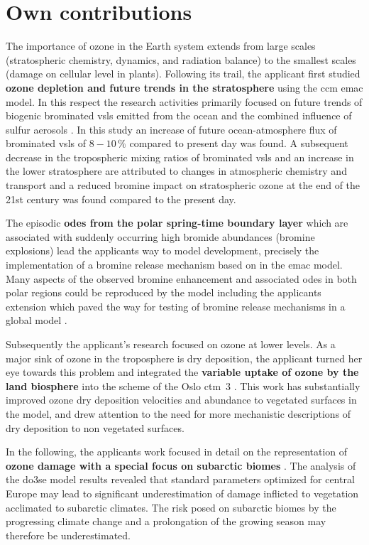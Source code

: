 \section{Own contributions}
\label{sec:contrib}
The importance of ozone in the Earth system extends from large scales (stratospheric chemistry, dynamics, and radiation balance) to the smallest scales (damage on cellular level in plants). Following its trail, the applicant first studied \textbf{ozone depletion and future trends in the stratosphere} using the \gls{ccm} \gls{emac} model. In this respect the research activities primarily focused on future trends of biogenic brominated \gls{vsls} emitted from the ocean and the combined influence of sulfur aerosols \parencite{ACP:Falk2017}. In this study an increase of future ocean-atmosphere flux of brominated \gls{vsls} of $8-10\,\%$ compared to present day was found. A subsequent decrease in the tropospheric mixing ratios of brominated \gls{vsls} and an increase in the lower stratosphere are attributed to changes in atmospheric chemistry and transport and a reduced bromine impact on stratospheric ozone at the end of the 21st century was found compared to the present day.

The episodic \textbf{\glspl{ode} from the polar spring-time boundary layer} which are associated with suddenly occurring high bromide abundances (bromine explosions) lead the applicants way to model development, precisely the implementation of a bromine release mechanism based on \textcite{ACP:Toyota2011} in the \gls{emac} model. Many aspects of the observed bromine enhancement and associated \glspl{ode} in both polar regions could be reproduced by the model including the applicants extension which paved the way for testing of bromine release mechanisms in a global model \parencite{GMD:Falk2018}.

Subsequently the applicant’s research focused on ozone at lower levels. As a major sink of ozone in the troposphere is dry deposition, the applicant turned her eye towards this problem and integrated the \textbf{variable uptake of ozone by the land biosphere} into the scheme of the Oslo \gls{ctm}~3 \parencite{GMD:Falk2019}. This work has substantially improved ozone dry deposition velocities and abundance to vegetated surfaces in the model, and drew attention to the need for more mechanistic descriptions of dry deposition to non vegetated surfaces.

In the following, the applicants work focused in detail on the representation of \textbf{ozone damage with a special focus on subarctic biomes} \parencites{ICPTF:Falk2021}{EGU:Falk2021}. The analysis of the \gls{do3se} model results revealed that standard parameters optimized for central Europe may lead to significant underestimation of damage inflicted to vegetation acclimated to subarctic climates. The risk posed on subarctic biomes by the progressing climate change and a prolongation of the growing season may therefore be underestimated.

